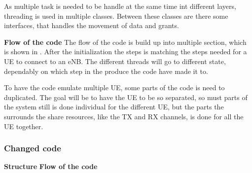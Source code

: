 

As multiple task is needed to be handle at the same time int different layers, threading is used in multiple classes.  Between these classes are there some interfaces, that handles the movement of data and grants.

\textbf{Flow of the code}
The flow of the code is build up into multiple section, which is shown in . After the initialization the steps is matching the steps needed for a UE to connect to an eNB. The different threads will go to different state, dependably on which step in the produce the code have made it to.



To have the code emulate multiple UE, some parts of the code is need to duplicated. The goal will be to have the UE to be so separated, so must parts of the system still is done individual for the different UE, but the parts the surrounds the share resources, like the TX and RX channels, is done for all the UE together.

\subsubsection{Changed code}

\textbf{Structure}
\textbf{Flow of the code}